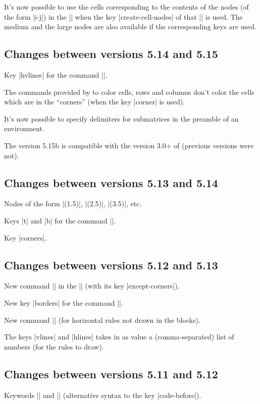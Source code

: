 \documentclass[dvipsnames]{article}%
\begin{document}
It's now possible to use the cells corresponding to the contents of the nodes
(of the form |i-j|) in the |\CodeBefore| when the key |create-cell-nodes| of
that |\CodeBefore| is used. The medium and the large nodes are also available
if the corresponding keys are used.

\subsection*{Changes between versions 5.14 and 5.15}

Key |hvlines| for the command |\Block|.

The commands provided by  to color cells, rows and columns
don't color the cells which are in the ``corners'' (when the key |corner| is
used).

It's now possible to specify delimiters for submatrices in the preamble of an
environment. 

The version 5.15b is compatible with the version 3.0+ of 
(previous versions were not).

\subsection*{Changes between versions 5.13 and 5.14}

Nodes of the form |(1.5)|, |(2.5)|, |(3.5)|, etc. 

Keys |t| and |b| for the command |\Block|.

Key |corners|. 

\subsection*{Changes between versions 5.12 and 5.13}

New command |\arraycolor| in the |\CodeBefore| (with its key
|except-corners|).

New key |borders| for the command |\Block|.

New command |\Hline| (for horizontal rules not drawn in the blocks).

The keys |vlines| and |hlines| takes in as value a (comma-separated) list of
numbers (for the rules to draw).

\subsection*{Changes between versions 5.11 and 5.12}

Keywords |\CodeBefore| and |\Body| (alternative syntax to the key
|code-before|). 
\end{document}
